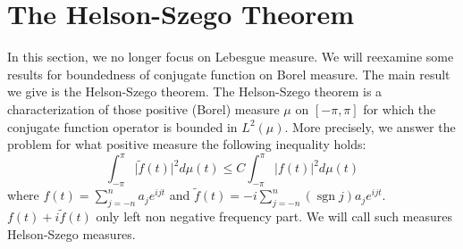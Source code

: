\documentclass{report}
\numberwithin{theorem}{subsection}
\numberwithin{remark}{subsection}
\newcommand{\abs}[1]{\left\lvert#1\right\rvert}
\newcommand{\absl}[1]{\lvert#1\rvert}
\newcommand{\sgn}{\operatorname{sgn}}
\begin{document}
\section{The Helson-Szego Theorem}
In this section, we no longer focus on Lebesgue measure. We will reexamine some results for boundedness of conjugate function on Borel measure.
The main result we give is the Helson-Szego theorem. The Helson-Szego theorem is a characterization of those positive (Borel) measure $\mu$ on $[-\pi,\pi]$ for which the conjugate function
operator is bounded in $L^2(\mu)$. More precisely, we answer the problem for what positive measure the following inequality holds:
\begin{equation*}
    \int_{-\pi}^{\pi}\absl{\tilde{f}(t)}^2 d\mu(t)\leq C\int_{-\pi}^{\pi}\abs{f(t)}^2 d\mu(t)
\end{equation*}
where $f(t)=\sum_{j=-n}^{n}{a_je^{ijt}}$ and $\tilde{f}(t)=-i\sum_{j=-n}^{n}{(\sgn j)a_je^{ijt}}$. $f(t)+i\tilde{f}(t)$ only left non negative frequency part.
We will call such measures Helson-Szego measures.
\end{document}
